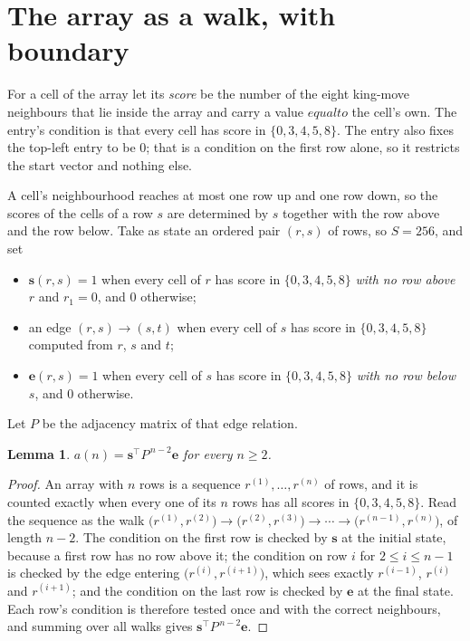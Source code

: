 \documentclass[11pt,a4paper]{article}
\theoremstyle{plain}
\newtheorem{lemma}[theorem]{Lemma}
\theoremstyle{definition}
\begin{document}
\section{The array as a walk, with boundary}

For a cell of the array let its \emph{score} be the number of the eight king-move neighbours that lie inside
the array and carry a value $equal to$ the cell's own. The entry's condition is that every cell
has score in $\{0,3,4,5,8\}$. The entry also fixes the top-left entry to be $0$; that is a condition on the first row alone, so it restricts the start vector and nothing else.

A cell's neighbourhood reaches at most one row up and one row down, so the scores of the
cells of a row $s$ are determined by $s$ together with the row above and the row below.
Take as state an ordered pair $(r,s)$ of rows, so $S=256$, and set
\begin{itemize}
\item $\mathbf{s}(r,s)=1$ when every cell of $r$ has score in $\{0,3,4,5,8\}$ \emph{with no row
above $r$} and $r_1=0$, and $0$ otherwise;
\item an edge $(r,s)\to(s,t)$ when every cell of $s$ has score in $\{0,3,4,5,8\}$ computed from
$r$, $s$ and $t$;
\item $\mathbf{e}(r,s)=1$ when every cell of $s$ has score in $\{0,3,4,5,8\}$ \emph{with no row
below $s$}, and $0$ otherwise.
\end{itemize}
Let $P$ be the adjacency matrix of that edge relation.

\begin{lemma}\label{lem:walk}
$a(n)=\mathbf{s}^{\!\top}P^{\,n-2}\mathbf{e}$ for every $n\ge2$.
\end{lemma}

\begin{proof}
An array with $n$ rows is a sequence $r^{(1)},\dots,r^{(n)}$ of rows, and it is counted
exactly when every one of its $n$ rows has all scores in $\{0,3,4,5,8\}$. Read the sequence as the
walk $\bigl(r^{(1)},r^{(2)}\bigr)\to\bigl(r^{(2)},r^{(3)}\bigr)\to\cdots\to
\bigl(r^{(n-1)},r^{(n)}\bigr)$, of length $n-2$. The condition on the first row is
checked by $\mathbf{s}$ at the initial state, because a first row has no row above it; the
condition on row $i$ for $2\le i\le n-1$ is checked by the edge entering
$\bigl(r^{(i)},r^{(i+1)}\bigr)$, which sees exactly $r^{(i-1)}$, $r^{(i)}$ and
$r^{(i+1)}$; and the condition on the last row is checked by $\mathbf{e}$ at the final
state. Each row's condition is therefore tested once and with the correct neighbours, and
summing over all walks gives $\mathbf{s}^{\!\top}P^{\,n-2}\mathbf{e}$.
\end{proof}
\end{document}
